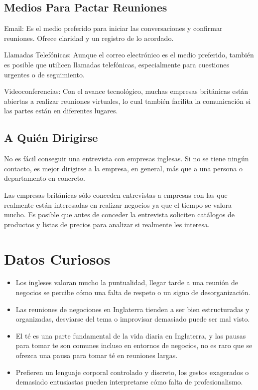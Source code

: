 \documentclass[letterpaper, 12pt]{article}
\begin{document}
\subsection*{Medios Para Pactar Reuniones}

Email: Es el medio preferido para iniciar las conversaciones y confirmar
reuniones. Ofrece claridad y un registro de lo acordado.

Llamadas Telefónicas: Aunque el correo electrónico es el medio preferido,
también es posible que utilicen llamadas telefónicas, especialmente para
cuestiones urgentes o de seguimiento.

Videoconferencias: Con el avance tecnológico, muchas empresas británicas están
abiertas a realizar reuniones virtuales, lo cual también facilita la
comunicación si las partes están en diferentes lugares.

\subsection*{A Quién Dirigirse}

No es fácil conseguir una entrevista con empresas inglesas. Si no se tiene
ningún contacto, es mejor dirigirse a la empresa, en general, más que a una
persona o departamento en concreto.

Las empresas británicas sólo conceden entrevistas a empresas con las que
realmente están interesadas en realizar negocios ya que el tiempo se valora
mucho. Es posible que antes de conceder la entrevista soliciten catálogos de
productos y listas de precios para analizar si realmente les interesa.

\section*{Datos Curiosos}

\begin{itemize}[label=$\bullet$]
      \item Los ingleses valoran mucho la puntualidad, llegar tarde a una reunión de
            negocios se percibe cómo una falta de respeto o un signo de desorganización.

      \item Las reuniones de negociones en Inglaterra tienden a ser bien estructuradas y
            organizadas, desviarse del tema o improvisar demasiado puede ser mal visto.

      \item El té es una parte fundamental de la vida diaria en Inglaterra, y las pausas
            para tomar te son comunes incluso en entornos de negocios, no es raro que se
            ofrezca una pausa para tomar té en reuniones largas.

      \item Prefieren un lenguaje corporal controlado y discreto, los gestos exagerados o
            demasiado entusiastas pueden interpretarse cómo falta de profesionalismo.

\end{itemize}

\newpage

\nocite{*}

\printbibliography
\end{document}
